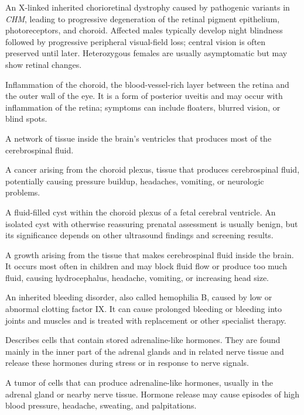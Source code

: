  An X-linked inherited chorioretinal dystrophy caused by pathogenic variants in \textit{CHM}, leading to progressive degeneration of the retinal pigment epithelium, photoreceptors, and choroid.
Affected males typically develop night blindness followed by progressive
peripheral visual-field loss; central vision is often preserved until later.
Heterozygous females are usually asymptomatic but may show retinal changes.

 Inflammation of the choroid, the blood-vessel-rich layer between the retina and the outer wall of the eye. It is a form of posterior uveitis and may occur with inflammation of the retina; symptoms can include floaters, blurred vision, or blind spots.

 A network of tissue inside the brain’s ventricles that produces most of the cerebrospinal fluid.

 A cancer arising from the choroid plexus, tissue that produces cerebrospinal fluid, potentially causing pressure buildup, headaches, vomiting, or neurologic problems.

 A fluid-filled cyst within the choroid plexus of a fetal cerebral ventricle. An isolated cyst
with otherwise reassuring prenatal assessment is usually benign, but its significance
depends on other ultrasound findings and screening results.

 A growth arising from the tissue that makes cerebrospinal fluid inside the brain. It occurs most often in children and may block fluid flow or produce too much fluid, causing hydrocephalus, headache, vomiting, or increasing head size.

 An inherited bleeding disorder, also called hemophilia B, caused by low or abnormal clotting factor IX. It can cause prolonged bleeding or bleeding into joints and muscles and is treated with replacement or other specialist therapy.

 Describes cells that contain stored adrenaline-like hormones. They are found mainly in the inner part of the adrenal glands and in related nerve tissue and release these hormones during stress or in response to nerve signals.

 A tumor of cells that can produce adrenaline-like hormones, usually in the adrenal gland or nearby nerve tissue. Hormone release may cause episodes of high blood pressure, headache, sweating, and palpitations.

